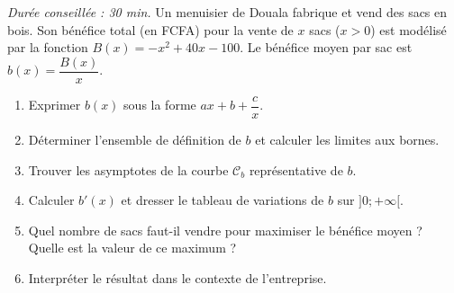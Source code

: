 \documentclass[11pt]{article}
\begin{document}
\begin{exercice}
\emph{Durée conseillée : 30 min.}
Un menuisier de Douala fabrique et vend des sacs en bois. Son bénéfice total (en FCFA) pour la vente de $x$ sacs ($x>0$) est modélisé par la fonction $B(x)=-x^2+40x-100$.
Le bénéfice moyen par sac est $b(x)=\dfrac{B(x)}{x}$.
\begin{enumerate}
\item Exprimer $b(x)$ sous la forme $ax+b+\dfrac{c}{x}$.
\item Déterminer l'ensemble de définition de $b$ et calculer les limites aux bornes.
\item Trouver les asymptotes de la courbe $\mathcal{C}_b$ représentative de $b$.
\item Calculer $b'(x)$ et dresser le tableau de variations de $b$ sur $]0;+\infty[$.
\item Quel nombre de sacs faut-il vendre pour maximiser le bénéfice moyen ? Quelle est la valeur de ce maximum ?
\item Interpréter le résultat dans le contexte de l'entreprise.
\end{enumerate}
\end{exercice}
\end{document}
